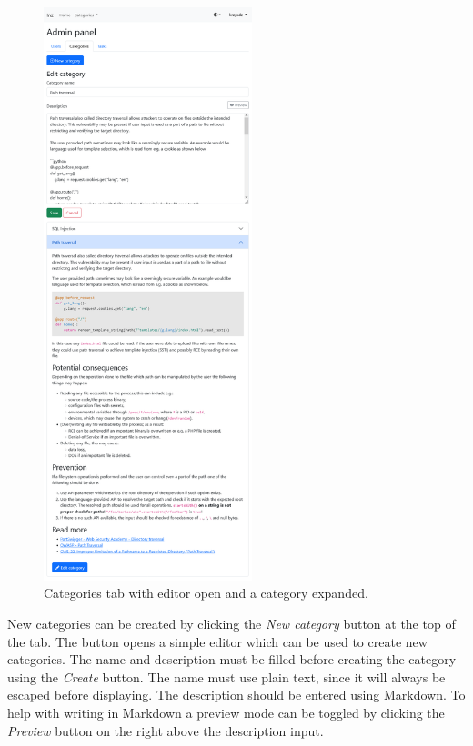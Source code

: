 \begin{figure}
    \centering
    \includegraphics[width=0.539\textwidth]{img/manual-admin-edit-category.png}
    \caption{Categories tab with editor open and a category expanded.}
    \label{fig:manual-admin-edit-category}
\end{figure}

New categories can be created by clicking the \textit{New category} button at the top of the tab. The button opens a simple editor which can be used to create new categories. The name and description must be filled before creating the category using the \textit{Create} button. The name must use plain text, since it will always be escaped before displaying. The description should be entered using Markdown. To help with writing in Markdown a preview mode can be toggled by clicking the \textit{Preview} button on the right above the description input.

